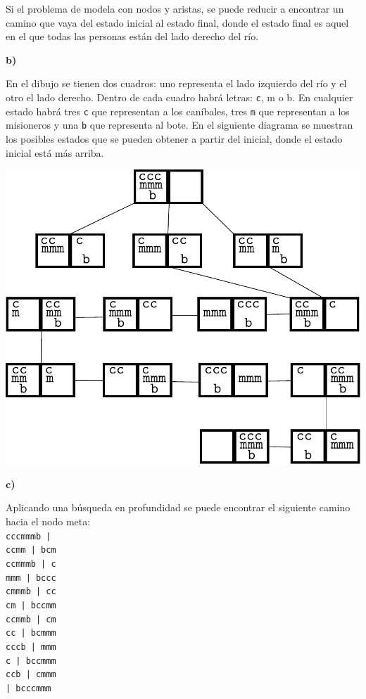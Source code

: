 \documentclass{article}
\begin{document}
Si el problema de modela con nodos y aristas, se puede reducir a encontrar un camino que vaya del estado inicial al estado final, donde el estado final es aquel en el que todas las personas están del lado derecho del río.

\textbf{b)}

En el dibujo se tienen dos cuadros: uno representa el lado izquierdo del río y el otro el lado derecho. Dentro de cada cuadro habrá letras: \texttt{c}, {m} o {b}. En cualquier estado habrá tres \texttt{c} que representan a los caníbales, tres \texttt{m} que representan a los misioneros y una \texttt{b} que representa al bote. En el siguiente diagrama se muestran los posibles estados que se pueden obtener a partir del inicial, donde el estado inicial está más arriba.

\includegraphics[scale=0.7]{canibales}

\textbf{c)}

Aplicando una búsqueda en profundidad se puede encontrar el siguiente camino hacia el nodo meta:\\
\texttt{cccmmmb |}\\
\texttt{ccmm | bcm}\\
\texttt{ccmmmb | c}\\
\texttt{mmm | bccc}\\
\texttt{cmmmb | cc}\\
\texttt{cm | bccmm}\\
\texttt{ccmmb | cm}\\
\texttt{cc | bcmmm}\\
\texttt{cccb | mmm}\\
\texttt{c | bccmmm}\\
\texttt{ccb | cmmm}\\
\texttt{| bcccmmm}
\end{document}
